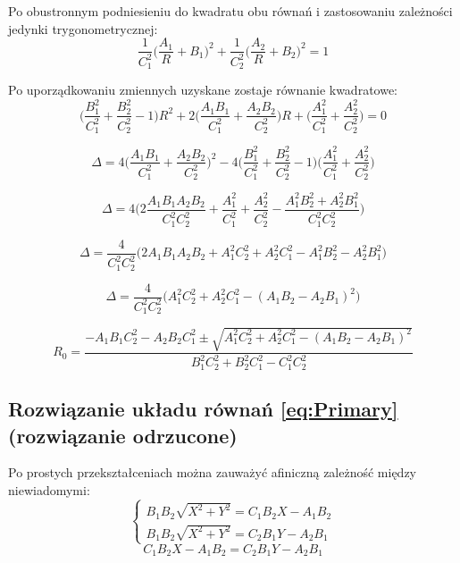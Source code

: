 \documentclass[10pt]{article}
\begin{document}
Po obustronnym podniesieniu do kwadratu obu równań i zastosowaniu zależności jedynki trygonometrycznej:
\begin{equation}
\frac{1}{C_1^2} \Big( \frac{A_1}{R} + B_1 \Big)^2 + 
\frac{1}{C_2^2} \Big( \frac{A_2}{R} + B_2 \Big)^2 = 1
\end{equation}

Po uporządkowaniu zmiennych uzyskane zostaje równanie kwadratowe:
\begin{equation}
\Bigg( \frac{B_1^2}{C_1^2} + \frac{B_2^2}{C_2^2} - 1 \Bigg) R^2 +
2 \Bigg( \frac{A_1B_1}{C_1^2} + \frac{A_2B_2}{C_2^2} \Bigg) R +
\Bigg( \frac{A_1^2}{C_1^2} + \frac{A_2^2}{C_2^2} \Bigg) = 0
\end{equation}

\begin{equation}
\Delta = 4 \Bigg( \frac{A_1B_1}{C_1^2} + \frac{A_2B_2}{C_2^2} \Bigg)^2 -
4 \Bigg( \frac{B_1^2}{C_1^2} + \frac{B_2^2}{C_2^2} - 1 \Bigg)
\Bigg( \frac{A_1^2}{C_1^2} + \frac{A_2^2}{C_2^2} \Bigg)
\end{equation}

\begin{equation}
\Delta = 4 \Bigg(2
\frac{A_1 B_1 A_2 B_2}{C_1^2 C_2^2} +
\frac{A_1^2}{C_1^2} +
\frac{A_2^2}{C_2^2} -
\frac{A_1^2 B_2^2 + A_2^2 B_1^2}{C_1^2 C_2^2} 
\Bigg)
\end{equation}

\begin{equation}
\Delta = \frac{4}{C_1^2C_2^2}
\Big( 2A_1B_1A_2B_2 + A_1^2C_2^2 + A_2^2C_1^2 - A_1^2B_2^2 - A_2^2B_1^2 \Big)
\end{equation}

\begin{equation}
\Delta = \frac{4}{C_1^2C_2^2}
\Big( A_1^2C_2^2 + A_2^2C_1^2 - ( A_1B_2 - A_2B_1)^2 \Big)
\end{equation}

\begin{equation}
R_0 = \frac{-A_1B_1C_2^2 -A_2B_2C_1^2 \pm
\sqrt{A_1^2C_2^2 + A_2^2C_1^2 - ( A_1B_2 - A_2B_1)^2}}
{B_1^2C_2^2 + B_2^2C_1^2 - C_1^2C_2^2}
\end{equation}

\subsection*{Rozwiązanie układu równań \eqref{eq:Primary} (rozwiązanie odrzucone)}
Po prostych przekształceniach można zauważyć afiniczną zależność między niewiadomymi:
\begin{equation}
\begin{cases}
B_1 B_2 \sqrt{X^2 + Y^2} = C_1 B_2 X - A_1 B_2 \\ 
B_1 B_2 \sqrt{X^2 + Y^2} = C_2 B_1 Y - A_2 B_1
\end{cases}
\end{equation}
\begin{equation}
C_1 B_2 X - A_1 B_2 = C_2 B_1 Y - A_2 B_1
\label{eq:Affine}
\end{equation}
\end{document}
